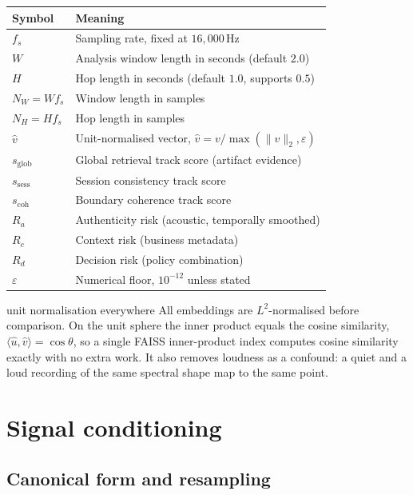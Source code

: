 \documentclass[11pt,a4paper]{article}
\newcommand{\unitvec}[1]{\widehat{#1}}
\begin{document}
\begin{longtable}{@{}lp{11.2cm}@{}}
\toprule
\textbf{Symbol} & \textbf{Meaning}\\
\midrule
\endhead
$f_s$ & Sampling rate, fixed at $16{,}000$\,Hz\\
$W$ & Analysis window length in seconds (default $2.0$)\\
$H$ & Hop length in seconds (default $1.0$, supports $0.5$)\\
$N_W = W f_s$ & Window length in samples\\
$N_H = H f_s$ & Hop length in samples\\
$\unitvec{v}$ & Unit-normalised vector, $\unitvec{v} = v/\max(\|v\|_2,\varepsilon)$\\
$s_{\mathrm{glob}}$ & Global retrieval track score (artifact evidence)\\
$s_{\mathrm{sess}}$ & Session consistency track score\\
$s_{\mathrm{coh}}$ & Boundary coherence track score\\
$R_a$ & Authenticity risk (acoustic, temporally smoothed)\\
$R_c$ & Context risk (business metadata)\\
$R_d$ & Decision risk (policy combination)\\
$\varepsilon$ & Numerical floor, $10^{-12}$ unless stated\\
\bottomrule
\end{longtable}

\begin{whybox}{unit normalisation everywhere}
All embeddings are $L^2$-normalised before comparison. On the unit sphere the
inner product equals the cosine similarity,
$\langle \unitvec{u},\unitvec{v}\rangle = \cos\theta$, so a single FAISS inner-product
index computes cosine similarity exactly with no extra work. It also removes
loudness as a confound: a quiet and a loud recording of the same spectral shape map
to the same point.
\end{whybox}

\section{Signal conditioning}

\subsection{Canonical form and resampling}
\end{document}
